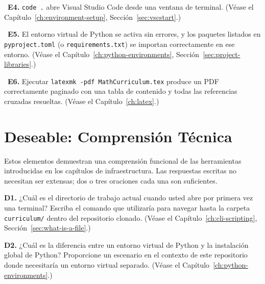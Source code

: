 \begin{Form}
\vs

\noindent\CheckBox[name=e4,width=0.4cm,height=0.4cm]{}~\textbf{E4.}
\texttt{code .} abre Visual Studio Code desde una ventana de terminal.
(Véase el Capítulo~\ref{ch:environment-setup}, Sección~\ref{sec:vscstart}.)

\vs

\noindent\CheckBox[name=e5,width=0.4cm,height=0.4cm]{}~\textbf{E5.}
El entorno virtual de Python se activa sin errores, y los paquetes
listados en \texttt{pyproject.toml} (o \texttt{requirements.txt})
se importan correctamente en ese entorno.
(Véase el Capítulo~\ref{ch:python-environments},
Sección~\ref{sec:project-libraries}.)

\vs

\noindent\CheckBox[name=e6,width=0.4cm,height=0.4cm]{}~\textbf{E6.}
Ejecutar \texttt{latexmk -pdf MathCurriculum.tex} produce un PDF
correctamente paginado con una tabla de contenido y todas las
referencias cruzadas resueltas.
(Véase el Capítulo~\ref{ch:latex}.)

\section{Deseable: Comprensión Técnica}
\label{sec:assess-desirable}

Estos elementos demuestran una comprensión funcional de las
herramientas introducidas en los capítulos de infraestructura. Las
respuestas escritas no necesitan ser extensas; dos o tres oraciones
cada una son suficientes.

\vs

\noindent\textbf{D1.} ¿Cuál es el directorio de trabajo actual cuando
usted abre por primera vez una terminal? Escriba el comando que
utilizaría para navegar hasta la carpeta \texttt{curriculum/} dentro
del repositorio clonado.
(Véase el Capítulo~\ref{ch:cli-scripting},
Sección~\ref{sec:what-is-a-file}.)\\[4pt]
\TextField[name=d1,width=\linewidth,height=2.5cm,multiline=true,
           bordercolor=black]{}

\vs

\noindent\textbf{D2.} ¿Cuál es la diferencia entre un entorno virtual
de Python y la instalación global de Python? Proporcione un escenario
en el contexto de este repositorio donde necesitaría un entorno
virtual separado.
(Véase el Capítulo~\ref{ch:python-environments}.)\\[4pt]
\TextField[name=d2,width=\linewidth,height=2.5cm,multiline=true,
           bordercolor=black]{}


\end{Form}
